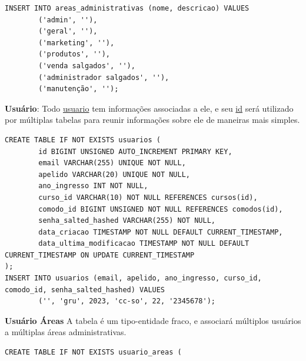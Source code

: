 \documentclass[11pt]{article}
\begin{document}
\begin{enumerate}
\begin{enumerate}
\begin{verbatim}
INSERT INTO areas_administrativas (nome, descricao) VALUES
        ('admin', ''),
        ('geral', ''),
        ('marketing', ''),
        ('produtos', ''),
        ('venda salgados', ''),
        ('administrador salgados', ''),
        ('manutenção', '');
\end{verbatim}
\textbf{Usuário}:
Todo \uline{usuario} tem informações associadas a ele, e seu \uline{id} será utilizado por múltiplas tabelas para reunir informações sobre ele de maneiras mais simples. 
\begin{verbatim}
CREATE TABLE IF NOT EXISTS usuarios (
        id BIGINT UNSIGNED AUTO_INCREMENT PRIMARY KEY,
        email VARCHAR(255) UNIQUE NOT NULL,
        apelido VARCHAR(20) UNIQUE NOT NULL,
        ano_ingresso INT NOT NULL,
        curso_id VARCHAR(10) NOT NULL REFERENCES cursos(id),
        comodo_id BIGINT UNSIGNED NOT NULL REFERENCES comodos(id),
        senha_salted_hashed VARCHAR(255) NOT NULL,
        data_criacao TIMESTAMP NOT NULL DEFAULT CURRENT_TIMESTAMP,
        data_ultima_modificacao TIMESTAMP NOT NULL DEFAULT CURRENT_TIMESTAMP ON UPDATE CURRENT_TIMESTAMP
);
INSERT INTO usuarios (email, apelido, ano_ingresso, curso_id, comodo_id, senha_salted_hashed) VALUES
        ('', 'gru', 2023, 'cc-so', 22, '2345678');
\end{verbatim}
\textbf{Usuário Áreas}
A tabela é um tipo-entidade fraco, e associará múltiplos usuários a múltiplas áreas administrativas.
\begin{verbatim}
CREATE TABLE IF NOT EXISTS usuario_areas (


\end{verbatim}
\end{enumerate}
\end{enumerate}
\end{document}
